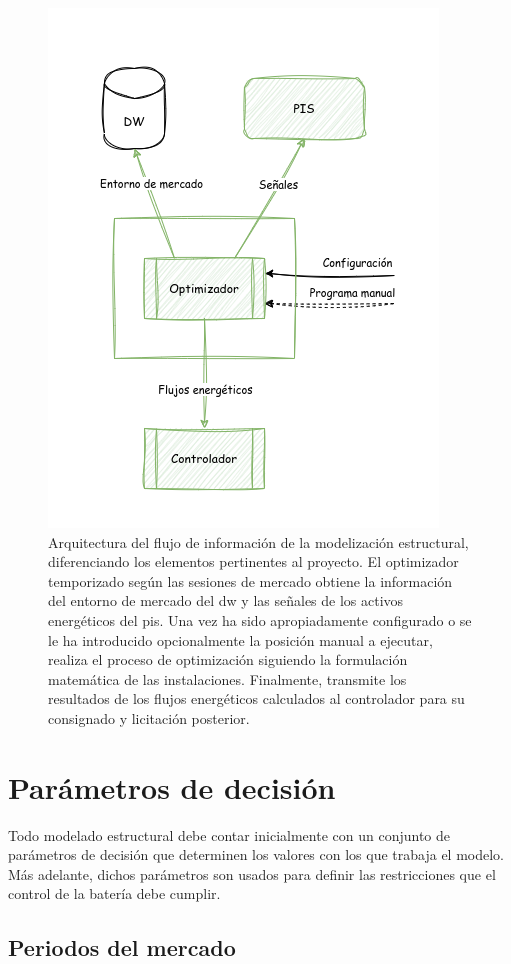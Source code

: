 \begin{figure}
  \centering
  \includegraphics[width=0.5\linewidth]{figures/arquitectura-modelizacion.png}
  \caption[Arquitectura de la modelización estructural.]{Arquitectura del flujo de información de la modelización estructural, diferenciando los elementos pertinentes al proyecto. El optimizador temporizado según las sesiones de mercado obtiene la información del entorno de mercado del \gls{dw} y las señales de los activos energéticos del \gls{pis}. Una vez ha sido apropiadamente configurado o se le ha introducido opcionalmente la posición manual a ejecutar, realiza el proceso de optimización siguiendo la formulación matemática de las instalaciones. Finalmente, transmite los resultados de los flujos energéticos calculados al controlador para su consignado y licitación posterior.}%
  \label{fig:arquitectura-modelizacion}
\end{figure}

\section{Parámetros de decisión}%
\label{makereference5.1}

Todo modelado estructural debe contar inicialmente con un conjunto de parámetros de decisión que determinen los valores con los que trabaja el modelo. Más adelante, dichos parámetros son usados para definir las restricciones que el control de la batería debe cumplir.

\subsection{Periodos del mercado}%
\label{makereference5.1.1}

